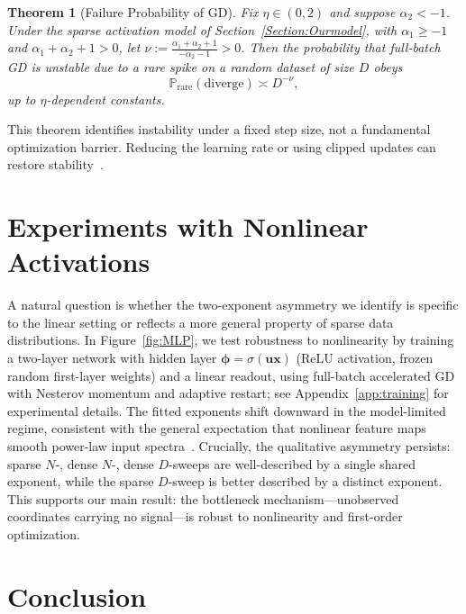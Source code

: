 \documentclass[11pt]{article}
\theoremstyle{plain}
\newtheorem{theorem}{Theorem}[section]
\theoremstyle{definition}
\theoremstyle{remark}
\newcommand{\JSCheck}[1]{#1}
\begin{document}
\begin{theorem}[Failure Probability of GD]
\label{thm:gd_failure_scaling}
Fix $\eta\in(0,2)$ and suppose $\alpha_2<-1$. Under the sparse activation model of
Section~\ref{Section:Ourmodel}, with $\alpha_1\geq-1$ and $\alpha_1+\alpha_2+1>0$, let
$\nu:=\frac{\alpha_1+\alpha_2+1}{-\alpha_2-1}>0$.
Then the probability that full-batch GD is unstable due to a rare spike on a random dataset of size $D$ obeys
\begin{equation}
\mathbb{P}_{\mathrm{rare}}(\mathrm{diverge})\asymp D^{-\nu},
\label{eq:gd_failure_scaling}
\end{equation}
up to $\eta$-dependent constants. 
\end{theorem}
\JSCheck{This theorem identifies instability under a fixed step size, not a fundamental optimization barrier. Reducing the learning rate or using clipped updates can restore stability~\citep{nguyen2023improved}.}





\section{Experiments with Nonlinear  Activations}


\JSCheck{A natural question is whether the two-exponent asymmetry we identify is specific to the linear setting or reflects a more general property of sparse data distributions. In Figure~\ref{fig:MLP}, we test robustness to nonlinearity by training a two-layer network with hidden layer $\boldsymbol{\phi} = \sigma(\mathbf{u}\mathbf{x})$ (ReLU activation, frozen random first-layer weights) and a linear readout, using full-batch accelerated GD with Nesterov momentum and adaptive restart; see Appendix~\ref{app:training} for experimental details. The fitted exponents shift downward in the model-limited regime, consistent with the general expectation that nonlinear feature maps smooth power-law input spectra~\citep{cho2009kernel,louart2018random,bietti2019inductive}. Crucially, the qualitative asymmetry persists: sparse $N$-, dense $N$-, dense $D$-sweeps are well-described by a single shared exponent, while the sparse $D$-sweep is better described by a distinct exponent. This supports our main result: the bottleneck mechanism---unobserved coordinates carrying no signal---is robust to nonlinearity and first-order optimization.}


\section{Conclusion}
\end{document}
